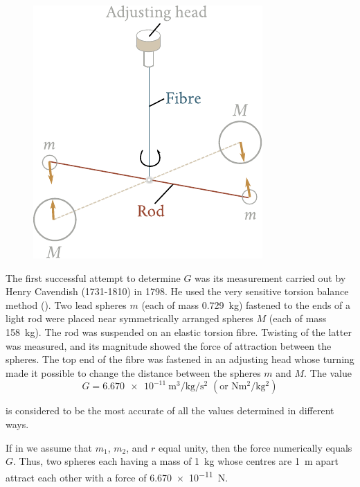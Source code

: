 \begin{figure}[t]
	\begin{center}
		\includegraphics[scale=0.95]{figures/ch_06/fig_6_3.pdf}
		\caption[]{}
		\label{fig:6_3}
	\end{center}
\vspace{-0.7cm}
\end{figure}

The first successful attempt to determine $G$ was its measurement carried out by Henry Cavendish (1731-1810) in 1798. He used the very sensitive torsion balance method (). Two lead spheres $m$ (each of mass \SI{0.729}{\kilo\gram}) fastened to the ends of a light rod were placed near symmetrically arranged spheres $M$ (each of mass \SI{158}{\kilo\gram}). The rod was suspended on an elastic torsion fibre. Twisting of the latter was measured, and its magnitude showed the force of attraction between the spheres. The top end of the fibre was fastened in an adjusting head whose turning made it possible to change the distance between the spheres $m$ and $M$. The value
\begin{equation*}
	G = \SI{6.670e-11}{\metre\cubed\per\kilo\gram\per\second\squared}\,\,(\text{or}\,\, \si{\newton\metre\squared\per\kilo\gram\squared})
\end{equation*}

\noindent
is considered to be the most accurate of all the values determined in different ways.

If in  we assume that $m_1$, $m_2$, and $r$ equal unity, then the force numerically equals $G$. Thus, two spheres each having a mass of \SI{1}{\kilo\gram} whose centres are \SI{1}{\metre} apart attract each other with a force of \SI{6.670e-11}{\newton}.

